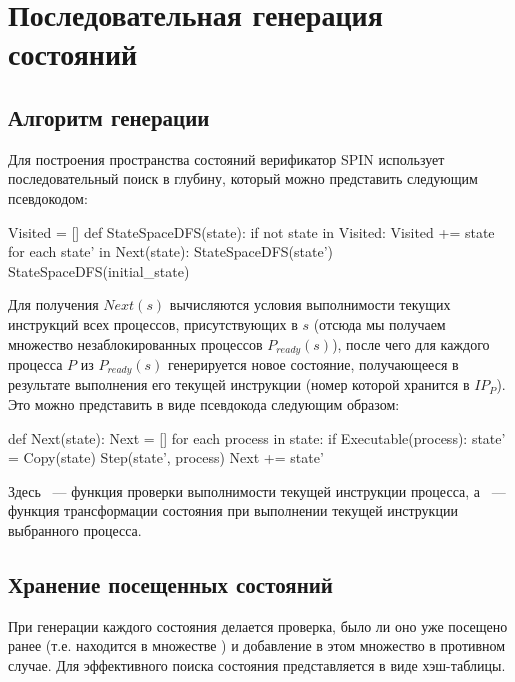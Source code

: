 \chapter{Последовательная генерация состояний}
\label{sec:seq-statespace}

\section{Алгоритм генерации}
\label{sec:seq-algo}

Для построения пространства состояний верификатор SPIN использует последовательный поиск в
глубину, который можно представить следующим псевдокодом:

\begin{CodeBlock}
Visited = []
def StateSpaceDFS(state):
    if not state in Visited:
        Visited += state
        for each state' in Next(state):
            StateSpaceDFS(state')
StateSpaceDFS(initial_state)
\end{CodeBlock}

Для получения $Next(s)$ вычисляются условия выполнимости текущих инструкций всех
процессов, присутствующих в $s$ (отсюда мы получаем множество незаблокированных процессов
$P_{ready}(s)$), после чего для каждого процесса $P$ из $P_{ready}(s)$ генерируется новое
состояние, получающееся в результате выполнения его текущей инструкции (номер которой
хранится в $IP_P$). Это можно представить в виде псевдокода следующим образом:

\begin{CodeBlock}
def Next(state):
    Next = []
    for each process in state:
        if Executable(process):
            state' = Copy(state)
            Step(state', process)
            Next += state'
\end{CodeBlock}

Здесь ~--- функция проверки выполнимости текущей инструкции процесса, а
~--- функция трансформации состояния при выполнении текущей инструкции
выбранного процесса.

\section{Хранение посещенных состояний}
\label{sec:state-hashing}

При генерации каждого состояния делается проверка, было ли оно уже посещено ранее
(т.е. находится в множестве ) и добавление в этом множество в противном
случае. Для эффективного поиска состояния  представляется в виде
хэш-таблицы.

